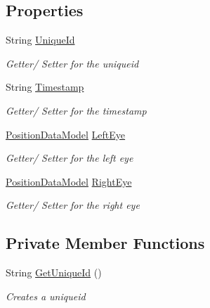 \subsection*{Properties}
\begin{DoxyCompactItemize}
\item 
String \hyperlink{class_web_analyzer_1_1_models_1_1_data_model_1_1_gaze_model_a4fbd98b9986f70848075e65dec5fd8b4}{Unique\+Id}
\begin{DoxyCompactList}\small\item\em Getter/ Setter for the uniqueid \end{DoxyCompactList}\item 
String \hyperlink{class_web_analyzer_1_1_models_1_1_data_model_1_1_gaze_model_af6b9cc989b7eefd89d4070d1683c8539}{Timestamp}
\begin{DoxyCompactList}\small\item\em Getter/ Setter for the timestamp \end{DoxyCompactList}\item 
\hyperlink{class_web_analyzer_1_1_models_1_1_data_model_1_1_position_data_model}{Position\+Data\+Model} \hyperlink{class_web_analyzer_1_1_models_1_1_data_model_1_1_gaze_model_ac6313c8c1b0c33a8d08f5f1fe99faa2a}{Left\+Eye}
\begin{DoxyCompactList}\small\item\em Getter/ Setter for the left eye \end{DoxyCompactList}\item 
\hyperlink{class_web_analyzer_1_1_models_1_1_data_model_1_1_position_data_model}{Position\+Data\+Model} \hyperlink{class_web_analyzer_1_1_models_1_1_data_model_1_1_gaze_model_a2303a593c1e6b377a480eb1903110452}{Right\+Eye}
\begin{DoxyCompactList}\small\item\em Getter/ Setter for the right eye \end{DoxyCompactList}\end{DoxyCompactItemize}
\subsection*{Private Member Functions}
\begin{DoxyCompactItemize}
\item 
String \hyperlink{class_web_analyzer_1_1_models_1_1_data_model_1_1_gaze_model_afd01f2bdad22ac2b2c667fef135b2ff9}{Get\+Unique\+Id} ()
\begin{DoxyCompactList}\small\item\em Creates a uniqueid \end{DoxyCompactList}\end{DoxyCompactItemize}
